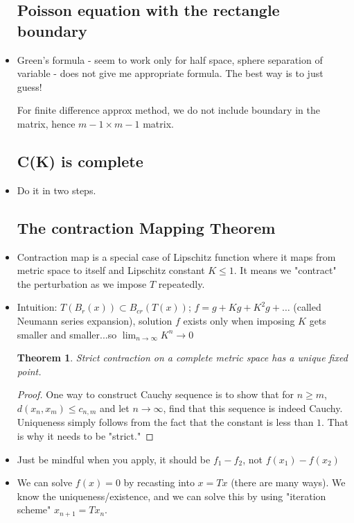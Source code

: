 \documentclass{article}
\newtheorem{theorem}{Theorem}
\theoremstyle{remark}
\begin{document}
\begin{itemize}
    

\subsection*{Poisson equation with the rectangle boundary}
\item Green's formula - seem to work only for half space, sphere
separation of variable - does not give me appropriate formula. The best way is to just guess!

For finite difference approx method, we do not include boundary in the matrix, hence $m-1\times m-1$ matrix.

\subsection*{C(K) is complete}
\item Do it in two steps.






\subsection*{The contraction Mapping Theorem}

\item Contraction map is a special case of Lipschitz function where it maps from metric space to itself and Lipschitz constant $K\leq 1$. It means we "contract" the perturbation as we impose $T$ repeatedly. 
\item Intuition: $T(B_r (x))\subset B_{cr}(T(x))$; $f=g+Kg+K^2g+\dots$ (called Neumann series expansion), solution $f$ exists only when imposing $K$ gets smaller and smaller...so $\lim_{n\to\infty}K^n\to 0$

\begin{theorem}
Strict contraction on a complete metric space has a unique fixed point.
\end{theorem}
\begin{proof}
One way to construct Cauchy sequence is to show that for $n\geq m$, $d(x_n,x_m)\leq c_{n,m}$ and let $n\to\infty$, find that this sequence is indeed Cauchy. Uniqueness simply follows from the fact that the constant is less than $1$. That is why it needs to be "strict."
\end{proof}
\item Just be mindful when you apply, it should be $f_1-f_2$, not $f(x_1)-f(x_2)$
\item
We can solve $f(x)=0$ by recasting into $x=Tx$ (there are many ways). We know the uniqueness/existence, and we can solve this by using "iteration scheme" $x_{n+1}=Tx_n$.


\end{itemize}
\end{document}
